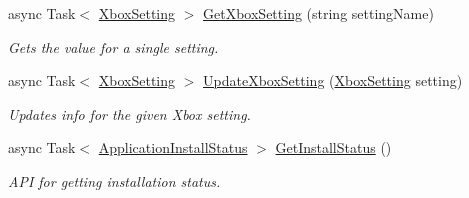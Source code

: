 \begin{DoxyCompactItemize}
async Task$<$ \hyperlink{class_microsoft_1_1_tools_1_1_windows_device_portal_1_1_device_portal_1_1_xbox_setting}{Xbox\+Setting} $>$ \hyperlink{class_microsoft_1_1_tools_1_1_windows_device_portal_1_1_device_portal_a846b6ef485ac89180d1d9c3a342f2ab2}{Get\+Xbox\+Setting} (string setting\+Name)
\begin{DoxyCompactList}\small\item\em Gets the value for a single setting. \end{DoxyCompactList}\item 
async Task$<$ \hyperlink{class_microsoft_1_1_tools_1_1_windows_device_portal_1_1_device_portal_1_1_xbox_setting}{Xbox\+Setting} $>$ \hyperlink{class_microsoft_1_1_tools_1_1_windows_device_portal_1_1_device_portal_afe50b57ce1e926237eeda238f15e8df9}{Update\+Xbox\+Setting} (\hyperlink{class_microsoft_1_1_tools_1_1_windows_device_portal_1_1_device_portal_1_1_xbox_setting}{Xbox\+Setting} setting)
\begin{DoxyCompactList}\small\item\em Updates info for the given Xbox setting. \end{DoxyCompactList}\item 
async Task$<$ \hyperlink{namespace_microsoft_1_1_tools_1_1_windows_device_portal_a6d809b60c74a8dfeca3698554f0afb6d}{Application\+Install\+Status} $>$ \hyperlink{class_microsoft_1_1_tools_1_1_windows_device_portal_1_1_device_portal_a43e13615811dc28fea8b56da1f420478}{Get\+Install\+Status} ()
\begin{DoxyCompactList}\small\item\em A\+PI for getting installation status. \end{DoxyCompactList}\end{DoxyCompactItemize}
